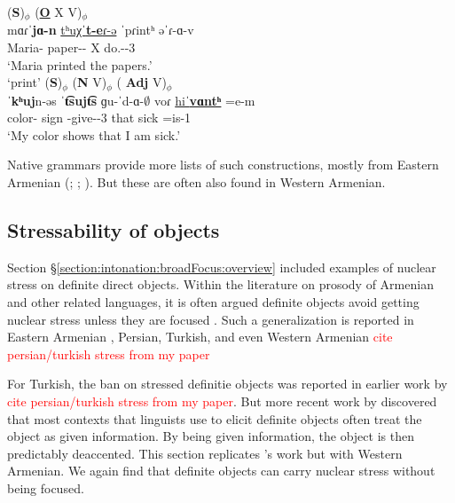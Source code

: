 \begin{exe}
	\ex 
	\begin{xlist}
		\ex \glll (\textbf{S})$_\phi$ (\textbf{\underline{O}} X V)$_\phi$ \\
		mɑɾˈ\textbf{jɑ-n} \underline{tʰuχˈ\textbf{t-e}ɾ-ə} ˈpɾintʰ əˈɾ-ɑ-v \\
		Maria-{} paper-{\pl}-{} X do.{\aorperf}-{\pst}-3{\pst} \\
		\trans `Maria printed the papers.' \label{ex: nuclear stress: complex: category: loan}
		\\  `print' \armenian{ըրաւ։}
		\ex \glll (\textbf{S})$_\phi$ ({\textbf{N}} V)$_\phi$ ( \textbf{Adj} V)$_\phi$ \\
		ˈ\textbf{kʰuj}n-əs {ˈ\textbf{t͡sujt͡s}}  ɡu-ˈd-ɑ-$\emptyset$ voɾ \underline{hiˈ\textbf{vɑntʰ}} =e-m\\
		color-{\possFsg} sign  {\ind}-give-{\thgloss}-3{\pst} that sick =is-1{\sg}\\
		\trans `My color shows that I am sick.' \label{ex: nuclear stress: complex: category: noun}
		\\ 
	\end{xlist}
\end{exe}


Native grammars provide more lists of such constructions, mostly from Eastern Armenian  (\citealt[20]{Abeghyan-1933-Meter}; \citealt[75]{Margaryan-1997-ArmenianPhonology}; \citealt[153]{Sevak-2009-Coursebook}). But these are often also found in Western Armenian.  

\subsection{Stressability of objects}\label{section:intonation:broadFocus:object}

Section \S\ref{section:intonation:broadFocus:overview} included examples of nuclear stress on definite direct objects. Within the literature on prosody of Armenian and other related languages, it is often argued definite objects avoid getting nuclear stress unless they are focused \citep{Dolatian-2022-InterfaceNuclearStressWesternArmenianTurkishPersian}. Such a generalization is reported in Eastern Armenian \citep{KahnemuyipourMegerdoomian-2011-secondcliticvP}, Persian,  Turkish, and even Western Armenian \textcolor{red}{cite persian/turkish stress from my paper}


For Turkish, the ban on stressed definitie objects was reported in earlier work by \textcolor{red}{cite persian/turkish stress from my paper}. But more recent work  by \citet{Nakipoglu-2009-SemanticsTurkishAccDefStress} discovered that most contexts that linguists use to elicit definite objects often treat the object as given information. By being given information, the object is then predictably deaccented. This section replicates \citet{Nakipoglu-2009-SemanticsTurkishAccDefStress}'s work but with Western Armenian. We again find that definite objects can carry nuclear stress without being focused. 


